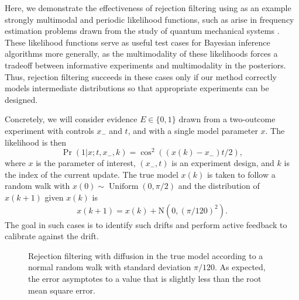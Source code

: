 \documentclass[twoside]{article}
\newcommand{\NN}{\mathrm{N}}
\begin{document}
Here, we demonstrate the effectiveness of rejection filtering using as an
example strongly multimodal and periodic likelihood functions, such as arise
in frequency estimation problems drawn from the study of quantum mechanical
systems \cite{ferrie_how_2013,wiebe_efficient_2015}. These likelihood functions serve as useful test cases for
Bayesian inference algorithms more generally, as the multimodality of these
likelihoods forces a tradeoff between informative experiments and
multimodality in the posteriors. Thus, rejection filtering succeeds in these cases only
if our method correctly models intermediate distributions so that appropriate
experiments can be designed.

Concretely, we will consider evidence $E\in\{0, 1\}$ drawn from a two-outcome
experiment with controls $x_-$ and $t$, and with a single model parameter $x$.
The likelihood is then
\begin{equation}
 \Pr(1 | x; t, x_-,k) = \cos^2((x(k) - x_-) t / 2),
\end{equation}
where $x$ is the parameter of interest, $(x_-, t)$ is an experiment design,
and $k$ is the index of the current update.  The true model $x(k)$ is taken to
follow a random walk with $x(0)\sim \operatorname{Uniform}(0,\pi/2)$ and the distribution
of $x(k+1)$ given $x(k)$ is
\begin{equation}
    x(k+1)=x(k) + \NN(0,(\pi/120)^2).
\end{equation}
The goal in such cases is to identify such drifts and perform active feedback to calibrate
against the drift.

\begin{figure}
    \caption{
        \label{fig:crej-diffusion}
        Rejection filtering with diffusion in the true model according to
        a normal random walk with standard deviation $\pi / 120$.  As expected, the error asymptotes to a value that is slightly less than the root mean square error.
    }
\end{figure}
\end{document}
